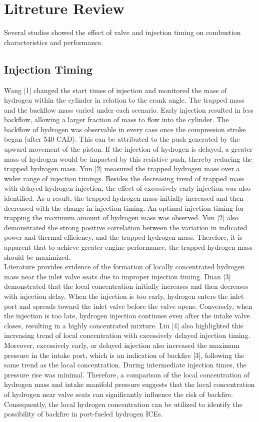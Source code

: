 \documentclass[conference]{IEEEtran}
\begin{document}
\section{Litreture Review}

Several studies showed the effect of valve and injection timing on combustion characteristics and performance.  

\subsection{Injection Timing}

Wang [1] changed the start times of injection and monitored the mass of hydrogen within the cylinder in relation to the crank angle. 
The trapped mass and the backflow mass varied under each scenario. 
Early injection resulted in less backflow, allowing a larger fraction of mass to flow into the cylinder. 
The backflow of hydrogen was observable in every case once the compression stroke began (after 540 CAD). 
This can be attributed to the push generated by the upward movement of the piston. 
If the injection of hydrogen is delayed, a greater mass of hydrogen would be impacted by this resistive push, thereby reducing the trapped hydrogen mass. 
Yun [2] measured the trapped hydrogen mass over a wider range of injection timings. 
Besides the decreasing trend of trapped mass with delayed hydrogen injection, the effect of excessively early injection was also identified. 
As a result, the trapped hydrogen mass initially increased and then decreased with the change in injection timing. 
An optimal injection timing for trapping the maximum amount of hydrogen mass was observed. 
Yun [2] also demonstrated the strong positive correlation between the variation in indicated power and thermal efficiency, and the trapped hydrogen mass. 
Therefore, it is apparent that to achieve greater engine performance, the trapped hydrogen mass should be maximized.\\

Literature provides evidence of the formation of locally concentrated hydrogen mass near the inlet valve seats due to improper injection timing. 
Duan [3] demonstrated that the local concentration initially increases and then decreases with injection delay. 
When the injection is too early, hydrogen enters the inlet port and spreads toward the inlet valve before the valve opens. 
Conversely, when the injection is too late, hydrogen injection continues even after the intake valve closes, resulting in a highly concentrated mixture. 
Liu [4] also highlighted this increasing trend of local concentration with excessively delayed injection timing. 
Moreover, excessively early, or delayed injection also increased the maximum pressure in the intake port, which is an indication of backfire [3], following the same trend as the local concentration. 
During intermediate injection times, the pressure rise was minimal. 
Therefore, a comparison of the local concentration of hydrogen mass and intake manifold pressure suggests that the local concentration of hydrogen near valve seats can significantly influence the risk of backfire. 
Consequently, the local hydrogen concentration can be utilized to identify the possibility of backfire in port-fueled hydrogen ICEs.
\end{document}
